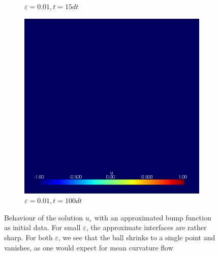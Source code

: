 \begin{figure}[h]
\begin{subfigure}[b]{0.3\linewidth}
		\caption{$ \varepsilon = 0.01, t =15 dt $}
	\end{subfigure}
	\hfill
	\begin{subfigure}[b]{0.3\linewidth}
		\includegraphics[width=\linewidth]{numerical_simulation/bump/eps_0.01000101.vtu}
		\caption{$ \varepsilon = 0.01, t =  100 dt $}
	\end{subfigure}
	
	\caption{Behaviour of the solution $u_{ \varepsilon } $ with an 
	approximated bump function as initial data. For small $ \varepsilon $, the 
	approximate interfaces are rather sharp. For both $ \varepsilon $, we see 
	that 
	the ball shrinks to a single point and vanishes, as one would expect for 
	mean curvature flow}
	\label{numerical_simulation_bump}
\end{figure}


